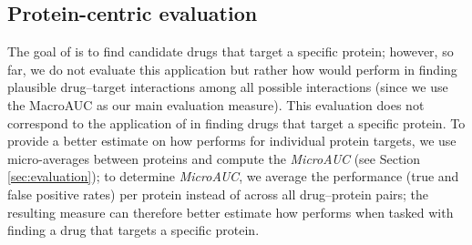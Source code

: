 \documentclass{bioinfo}
\begin{document}




\subsection{Protein-centric evaluation}
The goal of \name{} is to find candidate drugs that target a specific
protein; however, so far, we do not evaluate this application but
rather how \name{} would perform in finding plausible drug--target
interactions among all possible interactions (since we use the
MacroAUC as our main evaluation measure). This evaluation does not
correspond to the application of \name{} in finding drugs that target a
specific protein.  To provide a better estimate on how \name{} performs
for individual protein targets, we use micro-averages between proteins
and compute the \textit{MicroAUC} (see Section \ref{sec:evaluation});
to determine {\em MicroAUC}, we average the performance (true and
false positive rates) per protein instead of across all drug--protein
pairs; the resulting measure can therefore better estimate how \name{}
performs when tasked with finding a drug that targets a specific
protein.

\end{document}

